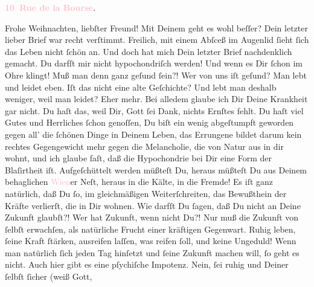            \pstart
           \begin{otherlanguage}{french}\textcolor{gray}{\textbf{\textbf{\textcolor{pink}{10 Rue de la Bourse}{}\ledrightnote{\textcolor{pink}{rue de la Bourse}}.}}}\end{otherlanguage}\pend
           \pstart{}Frohe Weihnachten, liebſter Freund!\pend\pstart
           Mit Deinem \label{K_L02834-1v}\label{K_L02834-1h} geht es wohl beſſer? Dein letzter lieber Brief war recht verſtimmt.
               Freilich, mit einem Abſceß im Augenlid ſieht ſich das Leben nicht ſchön an.\pend
           \pstart
           Und doch hat mich Dein letzter Brief nachdenklich gemacht. Du darfſt mir nicht
               hypochondriſch werden! Und wenn es Dir ſchon im Ohre klingt! Muß man denn ganz geſund
               ſein?! Wer von uns iſt geſund? Man lebt und leidet eben. Iſt das nicht eine alte
               Geſchichte? Und lebt man deshalb weniger, weil man leidet? Eher mehr.\pend
           \pstart
           {\pb}Bei alledem glaube ich Dir Deine Krankheit gar
               nicht. Du haſt das, weil Dir, Gott ſei Dank, nichts Ernſtes fehlt. Du haſt viel Gutes
               und Herrliches ſchon genoſſen, Du biſt ein wenig abgeſtumpft geworden gegen all’ die
               ſchönen Dinge in Deinem Leben, das Errungene bildet darum kein rechtes Gegengewicht
               mehr gegen die Melancholie, die von Natur aus in dir wohnt, und ich glaube faſt, daß
               die Hypochondrie bei Dir eine Form der Blaſirtheit iſt.\pend
           \pstart
           Aufgeſchüttelt werden müßteſt Du, heraus müßteſt Du aus Deinem behaglichen \textcolor{pink}{Wien}{}\ledrightnote{\textcolor{pink}{Wien}}er Neſt, heraus in die Kälte, in die Fremde! Es
               iſt ganz natürlich, daß Du ſo, im gleichmäßigen {\pb}Weiterſchreiten, das Bewußthein der Kräfte verlierſt, die in Dir wohnen.\pend
           \pstart
           Wie darfſt Du ſagen, daß Du nicht an Deine Zukunft glaubſt?! Wer hat Zukunft, wenn
               nicht Du?! Nur muß die Zukunft von ſelbſt erwachſen, als natürliche Frucht einer
               kräftigen Gegenwart. Ruhig leben, ſeine Kraft ſtärken, ausreifen laſſen, was reifen
               ſoll, und keine Ungeduld! Wenn man natürlich ſich jeden Tag hinſetzt und ſeine
               Zukunft machen will, ſo geht es nicht. Auch hier gibt es  eine pſychiſche Impotenz. Nein, ſei ruhig und Deiner ſelbſt ſicher (weiß Gott,
